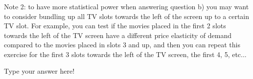 \documentclass{article}
\begin{document}
Note 2: to have more statistical power when answering question b) you may want to consider bundling up all TV slots towards the left of the screen up to a certain TV slot. For example, you can test if the movies placed in the first 2 slots towards the left of the TV screen have a different price elasticity of demand compared to the movies placed in slots 3 and up, and then you can repeat this exercise for the first 3 slots towards the left of the TV screen, the first 4, 5, etc...\\ 



\vspace{1cm}

{\color{blue}

Type your answer here!
}\\
\end{document}
